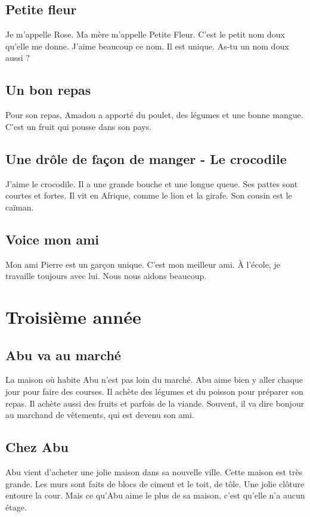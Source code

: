 \documentclass[11pt, french]{article}
\begin{document}
\subsection{Petite fleur}

Je m'appelle Rose. Ma mère m'appelle Petite Fleur. C'est le petit nom
doux qu'elle me donne. J'aime beaucoup ce nom. Il est unique. As-tu un
nom doux aussi ?

\subsection{Un bon repas}

Pour son repas, Amadou a apporté du poulet, des légumes et une bonne
mangue. C'est un fruit qui pousse dans son pays.

\subsection{Une drôle de façon de manger - Le crocodile}

J'aime le crocodile. Il a une grande bouche et une longue queue. Ses
pattes sont courtes et fortes. Il vit en Afrique, comme le lion et la
girafe. Son cousin est le caïman.

\subsection{Voice mon ami}

Mon ami Pierre est un garçon unique. C'est mon meilleur ami. À
l'école, je travaille toujours avec lui. Nous nous aidons beaucoup.

\vfill



\section{Troisième année}

\subsection{Abu va au marché}

La maison où habite Abu n'est pas loin du marché. Abu aime bien y
aller chaque jour pour faire des courses. Il achète des légumes et du
poisson pour préparer son repas. Il achète aussi des fruits et parfois
de la viande. Souvent, il va dire bonjour au marchand de vêtements,
qui est devenu son ami.

\subsection{Chez Abu}

Abu vient d'acheter une jolie maison dans sa nouvelle ville. Cette
maison est très grande. Les murs sont faits de blocs de ciment et le
toit, de tôle. Une jolie clôture entoure la cour. Mais ce qu'Abu aime
le plus de sa maison, c'est qu'elle n'a aucun étage.
\end{document}
